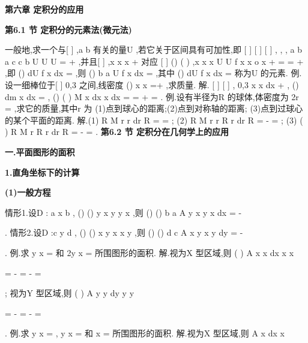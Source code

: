 \begin{center}
{\Large \bfseries \textcolor{lyred}{第六章 定积分的应用}}
\end{center}

\vspace{6pt}
{\large \bfseries \textcolor{lyred}{第6.1 节 定积分的元素法(微元法)}}

一般地,求一个与[
]
,a b 有关的量U ,若它关于区间具有可加性,即 
[
]
[
]
[
]
,
,
,
a b
a c
c b
U
U
U
=
+
,并且[
]
,x x
x
\forall 
+\Delta 
对应
[
]
()
(
)
,x x
x
U
U
f x
x
o
x
+\Delta 
\Delta 
=
=
\Delta +
\Delta 
,即 
()
dU
f x dx
=
,则
()
b
a
U
f x dx
=\int 
,其中
()
dU
f x dx
=
称为U 的\textcolor{lyred}{元素}. 
\textcolor{lyred}{例}.设一细棒位于[
]
0,3 之间,线密度
()
x
x
\rho 
=+
,求质量. 
解. [
]
[
]
,
0,3
x x
dx
\forall 
+
\subset 
,
()
dm
x dx
\rho 
=
,
()
(
)
M
x dx
x
dx
\rho 
=
=
+
=
\int 
\int 
. 
\textcolor{lyred}{例}.设有半径为R 的球体,体密度为
2r
\rho =
,求它的质量,其中r 为 
(1)点到球心的距离;(2)点到对称轴的距离; 
(3)点到过球心的某个平面的距离. 
解.(1)
R
M
r
r dr
R
\pi 
\pi 
=
\cdots 
=
\int 
; 
(2)
R
M
r
r
R
r dr
R
\pi 
\pi 
=
\cdots 
\cdots 
-
=
\int 
; 
(3)
(
)
R
M
r
R
r
dr
R
\pi 
\pi 
=
\cdots 
-
=
\int 
. 
\vspace{6pt}
{\large \bfseries \textcolor{lyred}{第6.2 节 定积分在几何学上的应用}}

\vspace{4pt}
{\bfseries \textcolor{lyred}{一.平面图形的面积}}

{\bfseries \textcolor{lyred}{1.直角坐标下的计算}}

{\bfseries \textcolor{lyred}{(1)一般方程}}

\textcolor{lyred}{情形1}.设D : a
x
b
\le 
\le 
,
()
()
y
x
y
y
x
\le 
\le 
,则
()
()
b
a
A
y
x
y
x
dx
=
-




\int 
. 
\textcolor{lyred}{情形2}.设D :c
y
d
\le 
\le 
,
()
()
x
y
x
x
y
\le 
\le 
,则
()
()
d
c
A
x
y
x
y
dy
=
-




\int 
. 
\textcolor{lyred}{例}.求
y
x
=
和
2y
x
=
所围图形的面积. 
解.视为X 型区域,则
(
)
A
x
x
dx
x
x


=
-
=
-
=




\int 
; 
视为Y 型区域,则
(
)
A
y
y
dy
y
y


=
-
=
-
=




\int 
. 
\textcolor{lyred}{例}.求
y
x
=
, y
x
=
和
x =
所围图形的面积. 
解.视为X 型区域,则
A
x
dx
x


